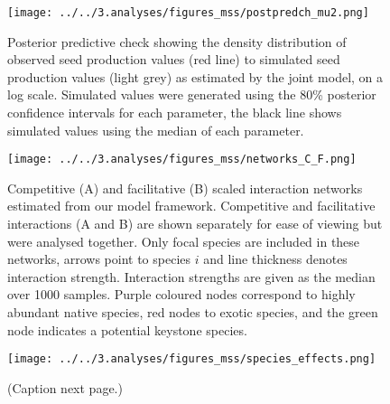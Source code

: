 \documentclass[a4,12pt]{article}
\begin{document}
    \begin{figure}[H]
        \texttt{[image: ../../3.analyses/figures\_mss/postpredch\_mu2.png]}
        \caption{Posterior predictive check showing the density distribution of observed seed production values (red line) to simulated seed production values (light grey) as estimated by the joint model, on a log scale. Simulated values were generated using the 80\% posterior confidence intervals for each parameter, the black line shows simulated values using the median of each parameter. }
        \label{fig:ppcheckmu2}
    \end{figure}


    \begin{figure}[H]
        \begin{centering}
        \texttt{[image: ../../3.analyses/figures\_mss/networks\_C\_F.png]}
        \caption{Competitive (A) and facilitative (B) scaled interaction networks estimated from our model framework. Competitive and facilitative interactions (A and B) are shown separately for ease of viewing but were analysed together. Only focal species are included in these networks, arrows point to species $i$ and line thickness denotes interaction strength. Interaction strengths are given as the median over 1000 samples. Purple coloured nodes correspond to highly abundant native species, red nodes to exotic species, and the green node indicates a potential keystone species.}
        \label{fig:netwks}
       \end{centering}
    \end{figure}  


    \begin{figure}[H]
        \begin{centering}
        \texttt{[image: ../../3.analyses/figures\_mss/species\_effects.png]}
        \caption{(Caption next page.)}
        \label{fig:species}
        \end{centering}
    \end{figure} 
\end{document}
